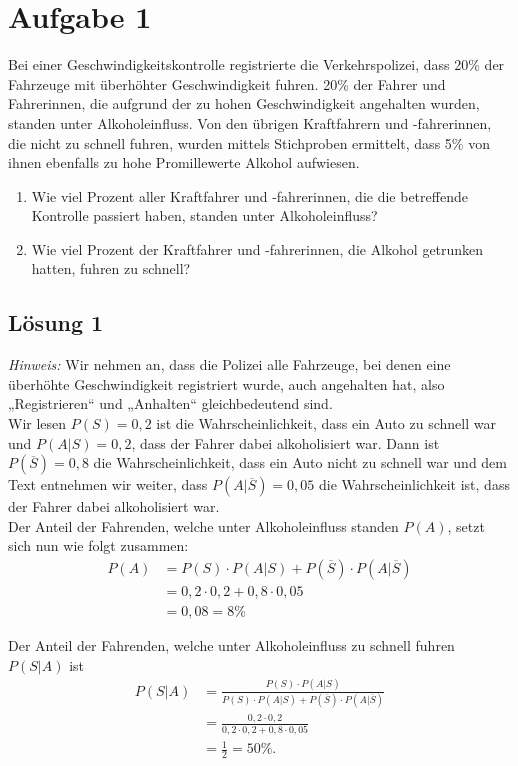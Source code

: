 \documentclass[main.tex]{subfiles}
\begin{document}
\section{Aufgabe 1}
Bei einer Geschwindigkeitskontrolle registrierte die Verkehrspolizei, dass 20\% der Fahrzeuge mit überhöhter Geschwindigkeit fuhren. 20\% der Fahrer und Fahrerinnen, die aufgrund der zu hohen Geschwindigkeit angehalten wurden, standen unter Alkoholeinfluss. Von den übrigen Kraftfahrern und -fahrerinnen, die nicht zu schnell fuhren, wurden mittels Stichproben ermittelt, dass 5\% von ihnen ebenfalls zu hohe Promillewerte Alkohol
aufwiesen.

\begin{enumerate}
    \item Wie viel Prozent aller Kraftfahrer und -fahrerinnen, die die betreffende Kontrolle passiert haben, standen unter Alkoholeinfluss?
    \item Wie viel Prozent der Kraftfahrer und -fahrerinnen, die Alkohol getrunken hatten, fuhren zu schnell?
\end{enumerate}

\subsection{Lösung 1}
\textit{Hinweis:} Wir nehmen an, dass die Polizei alle Fahrzeuge, bei denen eine überhöhte Geschwindigkeit registriert wurde, auch angehalten hat, also „Registrieren“ und „Anhalten“ gleichbedeutend sind.\\

Wir lesen $P(S) = 0,2$ ist die Wahrscheinlichkeit, dass ein Auto zu schnell war und $P(A|S) = 0,2$, dass der Fahrer dabei alkoholisiert war.
Dann ist $P(\overline{S}) = 0,8$ die Wahrscheinlichkeit, dass ein Auto nicht zu schnell war und dem Text entnehmen wir weiter, dass $P(A|\overline{S}) = 0,05$ die Wahrscheinlichkeit ist, dass der Fahrer dabei alkoholisiert war. \\

Der Anteil der Fahrenden, welche unter Alkoholeinfluss standen $P(A)$, setzt sich nun wie folgt zusammen:
$$\begin{aligned}
    P(A) &= P(S)\cdot P(A|S) + P(\overline{S})\cdot P(A|\overline{S}) \\
         &= 0,2 \cdot 0,2 + 0,8 \cdot 0,05 \\
         &= 0,08 = 8\%
\end{aligned}$$

Der Anteil der Fahrenden, welche unter Alkoholeinfluss zu schnell fuhren $P(S|A)$ ist 
$$\begin{aligned}
    P(S|A) &= \frac{P(S)\cdot P(A|S)}{P(S)\cdot P(A|S) + P(\overline{S})\cdot P(A|\overline{S})} \\[3mm]
           &= \frac{0,2 \cdot 0,2}{0,2 \cdot 0,2 + 0,8 \cdot 0,05}\\[2mm]
           &= \frac{1}{2} = 50\%.
\end{aligned}$$
\end{document}
